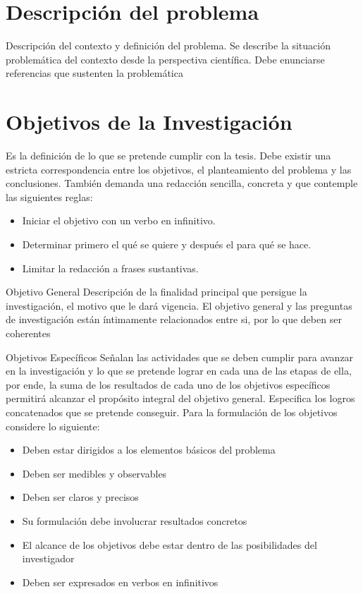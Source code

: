 \documentclass[12]{informe_investigacion}
\begin{document}
\section{Descripción del problema}
Descripción del contexto y definición del problema. Se describe la situación problemática del contexto desde la perspectiva científica. Debe enunciarse referencias que sustenten la problemática

\section{Objetivos de la Investigación}
Es la definición de lo que se pretende cumplir con la tesis. Debe existir una estricta correspondencia entre los objetivos, el planteamiento del problema y las conclusiones. También demanda una redacción sencilla, concreta y que contemple las siguientes reglas:
\begin{itemize}
    \item Iniciar el objetivo con un verbo en infinitivo.
    \item Determinar primero el qué se quiere y después el para qué se hace.
    \item Limitar la redacción a frases sustantivas.
\end{itemize}

\begin{subseccion}{Objetivo General}
Descripción de la finalidad principal que persigue la investigación, el motivo que le dará vigencia. El objetivo general y las preguntas de investigación están íntimamente relacionados entre si, por lo que deben ser coherentes
\end{subseccion}

\begin{subseccion}{Objetivos Específicos}
Señalan las actividades que se deben cumplir para avanzar en la investigación y lo que se pretende lograr en cada una de las etapas de ella, por ende, la suma de los resultados de cada uno de los objetivos específicos permitirá alcanzar el propósito integral del objetivo general. Especifica los logros concatenados que se pretende conseguir.
Para la formulación de los objetivos considere lo siguiente:
\begin{itemize}
    \item Deben estar dirigidos a los elementos básicos del problema
    \item Deben ser medibles y observables
    \item Deben ser claros y precisos
    \item Su formulación debe involucrar resultados concretos
    \item El alcance de los objetivos debe estar dentro de las posibilidades del investigador
    \item Deben ser expresados en verbos en infinitivos
\end{itemize}
\end{subseccion}
\end{document}
